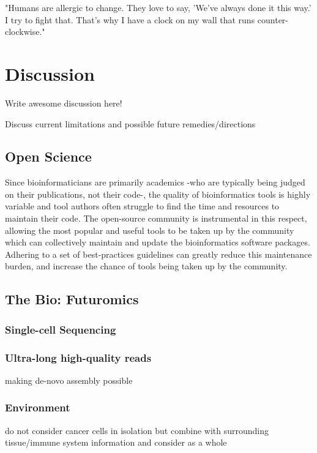 \begin{savequote}[75mm]
"Humans are allergic to change. They love to say, 'We've always done it this way.' I try to fight that. That's why I have a clock on my wall that runs counter-clockwise."
\end{savequote}

\chapter{Discussion}
\label{discussion}
\setcounter{figure}{-1}
\setcounter{table}{-1}
\setcounter{section}{-1}
\setcounter{NAT@ctr}{-1}

Write awesome discussion here!

Discuss current limitations and possible future remedies/directions

\section{Open Science}
Since bioinformaticians are primarily academics -who are typically being judged on their publications, not their code-, the quality of bioinformatics tools is highly variable and tool authors often struggle to find the time and resources to maintain their code. The open-source community is instrumental in this respect, allowing the most popular and useful tools to be taken up by the community which can collectively maintain and update the bioinformatics software packages. Adhering to a set of best-practices guidelines can greatly reduce this maintenance burden, and increase the chance of tools being taken up by the community.


\section{The Bio: Futuromics}

\subsection{Single-cell Sequencing}

\subsection{Ultra-long high-quality reads}
making de-novo assembly possible

\subsection{Environment}
do not consider cancer cells in isolation but combine with surrounding tissue/immune system information and consider as a whole


